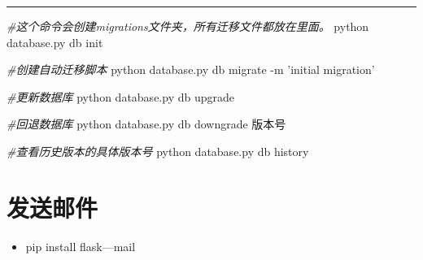 \documentclass[11pt]{article}
\providecommand{\tightlist}{%
      \setlength{\itemsep}{0pt}\setlength{\parskip}{0pt}}
\newenvironment{Shaded}{}{}
\newcommand{\StringTok}[1]{\textcolor[rgb]{0.25,0.44,0.63}{{#1}}}
\newcommand{\CommentTok}[1]{\textcolor[rgb]{0.38,0.63,0.69}{\textit{{#1}}}}
\newcommand{\NormalTok}[1]{{#1}}
\newcommand{\ExtensionTok}[1]{{#1}}
\begin{document}
\begin{center}\rule{0.5\linewidth}{\linethickness}\end{center}

\begin{Shaded}
\begin{Highlighting}[]
\CommentTok{#这个命令会创建migrations文件夹，所有迁移文件都放在里面。}
\ExtensionTok{python}\NormalTok{ database.py db init}

\CommentTok{#创建自动迁移脚本}
\ExtensionTok{python}\NormalTok{ database.py db migrate -m }\StringTok{'initial migration'}

\CommentTok{#更新数据库}
\ExtensionTok{python}\NormalTok{ database.py db upgrade}

\CommentTok{#回退数据库}
\ExtensionTok{python}\NormalTok{ database.py db downgrade 版本号}

\CommentTok{#查看历史版本的具体版本号}
\ExtensionTok{python}\NormalTok{ database.py db history}
\end{Highlighting}
\end{Shaded}

    \hypertarget{ux53d1ux9001ux90aeux4ef6}{%
\section{发送邮件}\label{ux53d1ux9001ux90aeux4ef6}}

\begin{itemize}
\tightlist
\item
  pip install flask---mail
\end{itemize}
\end{document}
